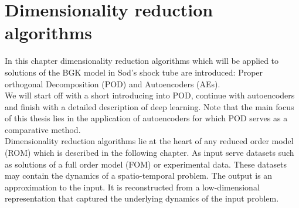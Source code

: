
\chapter{Dimensionality reduction algorithms}
\label{Ch:DimRedAl}

In this chapter dimensionality reduction algorithms which will be applied to solutions of the BGK model in Sod's shock tube are introduced: Proper orthogonal Decomposition (POD) and Autoencoders (AEs).\\
We will start off with a short introducing into POD, continue with autoencoders and finish with a detailed description of deep learning. Note that the main focus of this thesis lies in the application of autoencoders for which POD serves as a comparative method.\\
Dimensionality reduction algorithms lie at the heart of any reduced order model (ROM) which is described in the following chapter. As input serve datasets such as solutions of a full order model (FOM) or experimental data. These datasets may contain the dynamics of a spatio-temporal problem. The output is an approximation to the input. It is reconstructed from a low-dimensional representation that captured the underlying dynamics of the input problem. 
